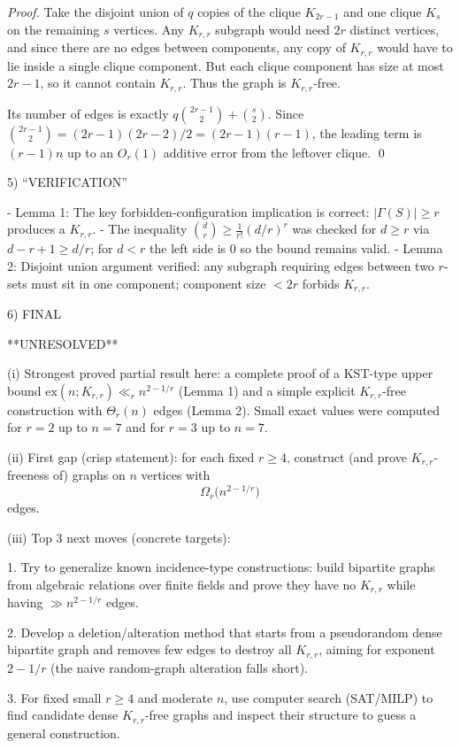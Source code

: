 \emph{Proof.}
Take the disjoint union of $q$ copies of the clique $K_{2r-1}$ and one clique $K_s$ on the remaining $s$ vertices.
Any $K_{r,r}$ subgraph would need $2r$ distinct vertices, and since there are no edges between components, any copy of $K_{r,r}$ would have to lie inside a single clique component.
But each clique component has size at most $2r-1$, so it cannot contain $K_{r,r}$.
Thus the graph is $K_{r,r}$-free.

Its number of edges is exactly $q\binom{2r-1}{2}+\binom{s}{2}$.
Since $\binom{2r-1}{2}=(2r-1)(2r-2)/2=(2r-1)(r-1)$, the leading term is $(r-1)n$ up to an $O_r(1)$ additive error from the leftover clique.
\qed

5) “VERIFICATION”

- Lemma 1: The key forbidden-configuration implication is correct: $|\Gamma(S)|\ge r$ produces a $K_{r,r}$.
- The inequality $\binom{d}{r}\ge \frac1{r!}(d/r)^r$ was checked for $d\ge r$ via $d-r+1\ge d/r$; for $d<r$ the left side is $0$ so the bound remains valid.
- Lemma 2: Disjoint union argument verified: any subgraph requiring edges between two $r$-sets must sit in one component; component size $<2r$ forbids $K_{r,r}$.

6) FINAL

**UNRESOLVED**

(i) Strongest proved partial result here: a complete proof of a KST-type upper bound $\mathrm{ex}(n;K_{r,r})\ll_r n^{2-1/r}$ (Lemma 1) and a simple explicit $K_{r,r}$-free construction with $\Theta_r(n)$ edges (Lemma 2). Small exact values were computed for $r=2$ up to $n=7$ and for $r=3$ up to $n=7$.

(ii) First gap (crisp statement): for each fixed $r\ge 4$, construct (and prove $K_{r,r}$-freeness of) graphs on $n$ vertices with
\[
\Omega_r\bigl(n^{2-1/r}\bigr)
\]
edges.

(iii) Top 3 next moves (concrete targets):

1. Try to generalize known incidence-type constructions: build bipartite graphs from algebraic relations over finite fields and prove they have no $K_{r,r}$ while having $\gg n^{2-1/r}$ edges.

2. Develop a deletion/alteration method that starts from a pseudorandom dense bipartite graph and removes few edges to destroy all $K_{r,r}$, aiming for exponent $2-1/r$ (the naive random-graph alteration falls short).

3. For fixed small $r\ge 4$ and moderate $n$, use computer search (SAT/MILP) to find candidate dense $K_{r,r}$-free graphs and inspect their structure to guess a general construction.

